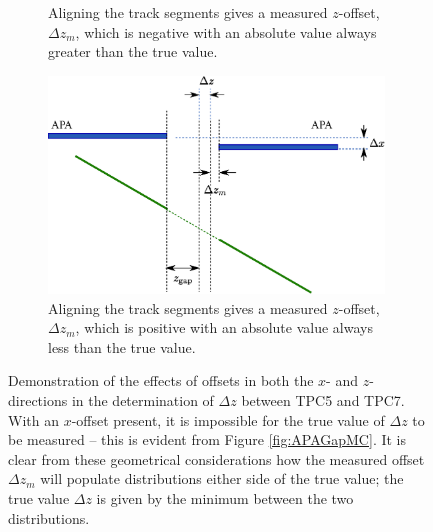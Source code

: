 \begin{figure}[p]
\begin{subfigure}[t]{0.48\linewidth}
    \caption{Aligning the track segments gives a measured $z$-offset, $\Delta z_m$, which is negative with an absolute value always greater than the true value.}
    \label{fig:APAGapXOffsetZOffsetPosFix}
  \end{subfigure}
  \hfill
  \begin{subfigure}[t]{0.48\linewidth}
    \centering
    \includegraphics[width=0.98\textwidth]{apa_gap_xoffset_zoffset_neg_fix.eps}
    \caption{Aligning the track segments gives a measured $z$-offset, $\Delta z_m$, which is positive with an absolute value always less than the true value.}
    \label{fig:APAGapXOffsetZOffsetNegFix}
  \end{subfigure}
  \caption{Demonstration of the effects of offsets in both the $x$- and $z$-directions in the determination of $\Delta z$ between TPC5 and TPC7.  With an $x$-offset present, it is impossible for the true value of $\Delta z$ to be measured -- this is evident from Figure \ref{fig:APAGapMC}.  It is clear from these geometrical considerations how the measured offset $\Delta z_m$ will populate distributions either side of the true value; the true value $\Delta z$ is given by the minimum between the two distributions.}
  \label{fig:APAGapXOffsetZOffset}
\end{figure}

